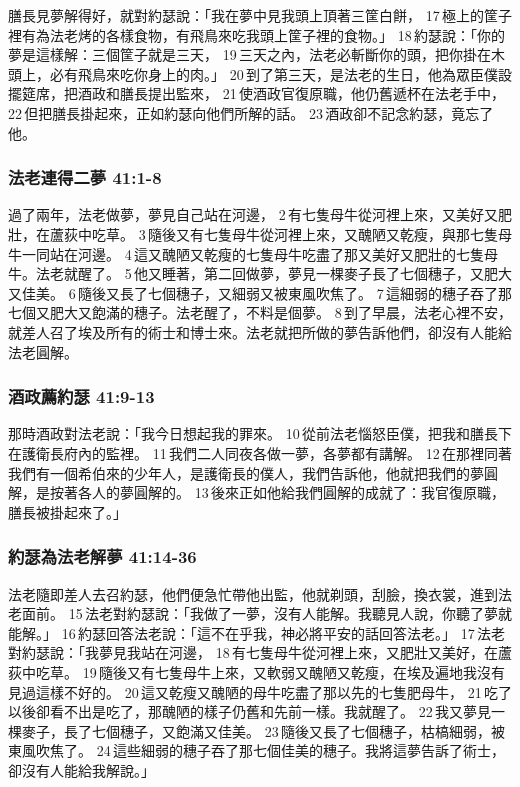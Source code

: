 膳長見夢解得好，就對約瑟說：「我在夢中見我頭上頂著三筐白餅， 17 極上的筐子裡有為法老烤的各樣食物，有飛鳥來吃我頭上筐子裡的食物。」 18 約瑟說：「你的夢是這樣解：三個筐子就是三天， 19 三天之內，法老必斬斷你的頭，把你掛在木頭上，必有飛鳥來吃你身上的肉。」 20 到了第三天，是法老的生日，他為眾臣僕設擺筵席，把酒政和膳長提出監來， 21 使酒政官復原職，他仍舊遞杯在法老手中， 22 但把膳長掛起來，正如約瑟向他們所解的話。 23 酒政卻不記念約瑟，竟忘了他。

\subsubsection{法老連得二夢 41:1-8} 
過了兩年，法老做夢，夢見自己站在河邊， 2 有七隻母牛從河裡上來，又美好又肥壯，在蘆荻中吃草。 3 隨後又有七隻母牛從河裡上來，又醜陋又乾瘦，與那七隻母牛一同站在河邊。 4 這又醜陋又乾瘦的七隻母牛吃盡了那又美好又肥壯的七隻母牛。法老就醒了。 5 他又睡著，第二回做夢，夢見一棵麥子長了七個穗子，又肥大又佳美。 6 隨後又長了七個穗子，又細弱又被東風吹焦了。 7 這細弱的穗子吞了那七個又肥大又飽滿的穗子。法老醒了，不料是個夢。 8 到了早晨，法老心裡不安，就差人召了埃及所有的術士和博士來。法老就把所做的夢告訴他們，卻沒有人能給法老圓解。

\subsubsection{酒政薦約瑟 41:9-13} 
那時酒政對法老說：「我今日想起我的罪來。 10 從前法老惱怒臣僕，把我和膳長下在護衛長府內的監裡。 11 我們二人同夜各做一夢，各夢都有講解。 12 在那裡同著我們有一個希伯來的少年人，是護衛長的僕人，我們告訴他，他就把我們的夢圓解，是按著各人的夢圓解的。 13 後來正如他給我們圓解的成就了：我官復原職，膳長被掛起來了。」

\subsubsection{約瑟為法老解夢 41:14-36} 
法老隨即差人去召約瑟，他們便急忙帶他出監，他就剃頭，刮臉，換衣裳，進到法老面前。 15 法老對約瑟說：「我做了一夢，沒有人能解。我聽見人說，你聽了夢就能解。」 16 約瑟回答法老說：「這不在乎我，神必將平安的話回答法老。」 17 法老對約瑟說：「我夢見我站在河邊， 18 有七隻母牛從河裡上來，又肥壯又美好，在蘆荻中吃草。 19 隨後又有七隻母牛上來，又軟弱又醜陋又乾瘦，在埃及遍地我沒有見過這樣不好的。 20 這又乾瘦又醜陋的母牛吃盡了那以先的七隻肥母牛， 21 吃了以後卻看不出是吃了，那醜陋的樣子仍舊和先前一樣。我就醒了。 22 我又夢見一棵麥子，長了七個穗子，又飽滿又佳美。 23 隨後又長了七個穗子，枯槁細弱，被東風吹焦了。 24 這些細弱的穗子吞了那七個佳美的穗子。我將這夢告訴了術士，卻沒有人能給我解說。」



